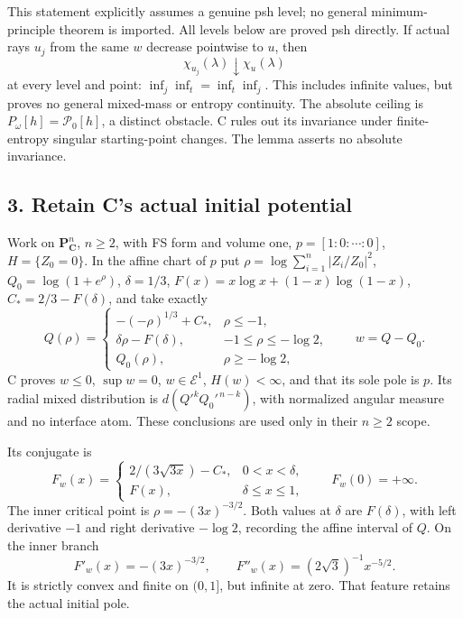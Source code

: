 \documentclass[
  11pt,
]{article}
\begin{document}
This statement explicitly assumes a genuine psh level; no general
minimum-principle theorem is imported. All levels below are proved psh
directly. If actual rays \(u_j\) from the same \(w\) decrease pointwise
to \(u\), then \[
\chi_{u_j}(\lambda)\downarrow\chi_u(\lambda)
\tag{3}
\] at every level and point: \(\inf_j\inf_t=\inf_t\inf_j\). This
includes infinite values, but proves no general mixed-mass or entropy
continuity. The absolute ceiling is \(P_\omega[h]=\mathscr P_0[h]\), a
distinct obstacle. C rules out its invariance under finite-entropy
singular starting-point changes. The lemma asserts no absolute
invariance.

\subsection{3. Retain C's actual initial
potential}\label{retain-cs-actual-initial-potential}

Work on \(\mathbf P^n_{\mathbf C}\), \(n\ge2\), with FS form and volume
one, \(p=[1:0:\cdots:0]\), \(H=\{Z_0=0\}\). In the affine chart of \(p\)
put \(\rho=\log\sum_{i=1}^n|Z_i/Z_0|^2\), \(Q_0=\log(1+e^\rho)\),
\(\delta=1/3\), \(F(x)=x\log x+(1-x)\log(1-x)\), \(C_*=2/3-F(\delta)\),
and take exactly \[
Q(\rho)=
\begin{cases}
-(-\rho)^{1/3}+C_*,&\rho\le-1,\\
\delta\rho-F(\delta),&-1\le\rho\le-\log2,\\
Q_0(\rho),&\rho\ge-\log2,
\end{cases}\qquad w=Q-Q_0.
\tag{4}
\] C proves \(w\le0\), \(\sup w=0\), \(w\in\mathcal E^1\),
\(H(w)<\infty\), and that its sole pole is \(p\). Its radial mixed
distribution is \(d(Q'^kQ_0'^{\,n-k})\), with normalized angular measure
and no interface atom. These conclusions are used only in their
\(n\ge2\) scope.

Its conjugate is \[
F_w(x)=
\begin{cases}
2/(3\sqrt{3x})-C_*,&0<x<\delta,\\
F(x),&\delta\le x\le1,
\end{cases}\qquad F_w(0)=+\infty.
\tag{5}
\] The inner critical point is \(\rho=-(3x)^{-3/2}\). Both values at
\(\delta\) are \(F(\delta)\), with left derivative \(-1\) and right
derivative \(-\log2\), recording the affine interval of \(Q\). On the
inner branch \[
F'_w(x)=-(3x)^{-3/2},\qquad F''_w(x)=(2\sqrt3)^{-1}x^{-5/2}.
\tag{6}
\] It is strictly convex and finite on \((0,1]\), but infinite at zero.
That feature retains the actual initial pole.
\end{document}
